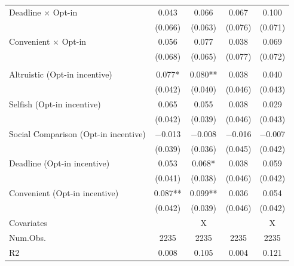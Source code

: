 \documentclass[
]{article}
\begin{document}
\begin{table}
\begin{threeparttable}
\begin{tabular}[t]{lcccc}
Deadline $\times$ Opt-in & \num{0.043} & \num{0.066} & \num{0.067} & \num{0.100}\\
 & (\num{0.066}) & (\num{0.063}) & (\num{0.076}) & (\num{0.071})\\
Convenient $\times$ Opt-in & \num{0.056} & \num{0.077} & \num{0.038} & \num{0.069}\\
 & (\num{0.068}) & (\num{0.065}) & (\num{0.077}) & (\num{0.072})\\
\addlinespace[0.3em]
\multicolumn{5}{l}{\textbf{Linear combination test: Treatment + Opt-in $\times$ Treatment}}\\
\hspace{1em}Altruistic (Opt-in incentive) & \num{0.077}* & \num{0.080}** & \num{0.038} & \num{0.040}\\
\hspace{1em} & (\num{0.042}) & (\num{0.040}) & (\num{0.046}) & (\num{0.043})\\
\hspace{1em}Selfish (Opt-in incentive) & \num{0.065} & \num{0.055} & \num{0.038} & \num{0.029}\\
\hspace{1em} & (\num{0.042}) & (\num{0.039}) & (\num{0.046}) & (\num{0.043})\\
\hspace{1em}Social Comparison (Opt-in incentive) & \num{-0.013} & \num{-0.008} & \num{-0.016} & \num{-0.007}\\
\hspace{1em} & (\num{0.039}) & (\num{0.036}) & (\num{0.045}) & (\num{0.042})\\
\hspace{1em}Deadline (Opt-in incentive) & \num{0.053} & \num{0.068}* & \num{0.038} & \num{0.059}\\
\hspace{1em} & (\num{0.041}) & (\num{0.038}) & (\num{0.046}) & (\num{0.042})\\
\hspace{1em}Convenient (Opt-in incentive) & \num{0.087}** & \num{0.099}** & \num{0.036} & \num{0.054}\\
\hspace{1em} & (\num{0.042}) & (\num{0.039}) & (\num{0.046}) & (\num{0.042})\\
\midrule
Covariates &  & X &  & X\\
Num.Obs. & \num{2235} & \num{2235} & \num{2235} & \num{2235}\\
R2 & \num{0.008} & \num{0.105} & \num{0.004} & \num{0.121}\\

\end{tabular}
\end{threeparttable}
\end{table}
\end{document}
